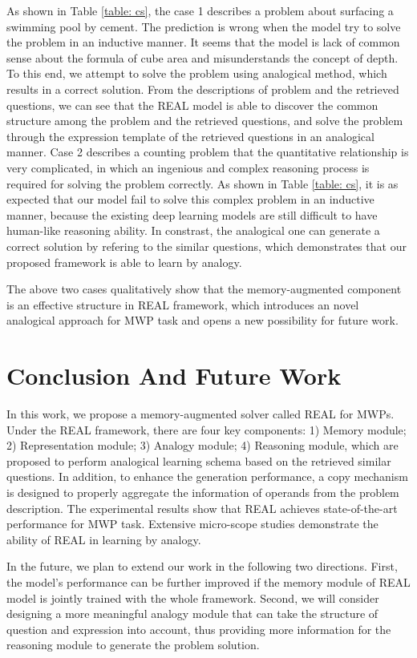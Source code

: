 \documentclass[11pt, a4paper]{article}
\begin{document}
	As shown in Table \ref{table: cs}, the case 1 describes a problem about surfacing a swimming pool by cement. The prediction is wrong when the model try to solve the problem in an inductive manner. It seems that the model is lack of common sense about the formula of cube area and misunderstands the concept of depth. To this end, we attempt to solve the problem using analogical method, which results in a correct solution. From the descriptions of problem and the retrieved questions, we can see that the REAL model is able to discover the common structure among the problem and the retrieved questions, and solve the problem through the expression template of the retrieved questions in an analogical manner. Case 2 describes a counting problem that the quantitative relationship is very complicated, in which an ingenious and complex reasoning process is required for solving the problem correctly. As shown in Table \ref{table: cs}, it is as expected that our model fail to solve this complex problem in an inductive manner, because the existing deep learning models are still difficult to have human-like reasoning ability. In constrast, the analogical one can generate a correct solution by refering to the similar questions, which demonstrates that our proposed framework is able to learn by analogy. 
	
	The above two cases qualitatively show that the memory-augmented component is an effective structure in REAL framework, which introduces an novel analogical approach for MWP task and opens a new possibility for future work.

\section{Conclusion And Future Work}
In this work, we propose a memory-augmented solver called REAL for MWPs. Under the REAL framework, there are four key components: 1) Memory module; 2) Representation module; 3) Analogy module; 4) Reasoning module, which are proposed to perform analogical learning schema based on the retrieved similar questions. In addition, to enhance the generation performance, a copy mechanism is designed to properly aggregate the information of operands from the problem description. The experimental results show that REAL achieves state-of-the-art performance for MWP task. Extensive micro-scope studies demonstrate the ability of REAL in learning by analogy.

In the future, we plan to extend our work in the following two directions. First, the model's performance can be further improved if the memory module of REAL model is jointly trained with the whole framework. Second, we will consider designing a more meaningful analogy module that can take the structure of question and expression into account, thus providing more information for the reasoning module to generate the problem solution.



\end{document}
